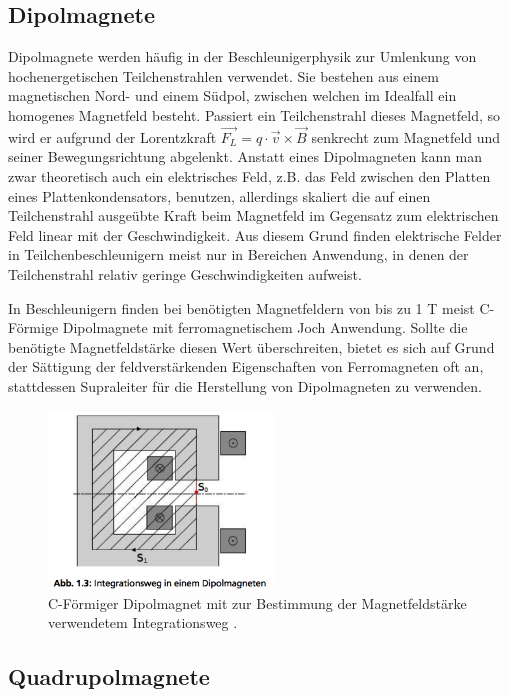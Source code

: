 \documentclass[bigchapter,colorback,accentcolor=tud4b,linedtoc,11pt]{tudreport}
\begin{document}
\subsection{Dipolmagnete}

Dipolmagnete werden häufig in der Beschleunigerphysik zur Umlenkung von hochenergetischen Teilchenstrahlen verwendet. Sie bestehen aus einem magnetischen Nord- und einem Südpol, zwischen welchen im Idealfall ein homogenes Magnetfeld besteht. Passiert ein Teilchenstrahl dieses Magnetfeld, so wird er aufgrund der Lorentzkraft $\vec{F_L} = q \cdot \vec{v} \times \vec{B}$ senkrecht zum Magnetfeld und seiner Bewegungsrichtung abgelenkt. Anstatt eines Dipolmagneten kann man zwar theoretisch auch ein elektrisches Feld, z.B. das Feld zwischen den Platten eines Plattenkondensators, benutzen, allerdings skaliert die auf einen Teilchenstrahl ausgeübte Kraft beim Magnetfeld im Gegensatz zum elektrischen Feld linear mit der Geschwindigkeit. Aus diesem Grund finden elektrische Felder in Teilchenbeschleunigern meist nur in Bereichen Anwendung, in denen der Teilchenstrahl relativ geringe Geschwindigkeiten aufweist.

In Beschleunigern finden bei benötigten Magnetfeldern von bis zu 1 T meist C-Förmige Dipolmagnete mit ferromagnetischem Joch Anwendung. Sollte die benötigte Magnetfeldstärke diesen Wert überschreiten, bietet es sich auf Grund der Sättigung der feldverstärkenden Eigenschaften von Ferromagneten oft an, stattdessen Supraleiter für die Herstellung von Dipolmagneten zu verwenden.

\begin{figure}[H]
\centering
\includegraphics[width=60mm]{img/dipol.png}
\caption{C-Förmiger Dipolmagnet mit zur Bestimmung der Magnetfeldstärke verwendetem Integrationsweg \cite{anleitung}.}
\end{figure}

\subsection{Quadrupolmagnete}
\end{document}
